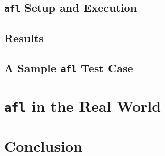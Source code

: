 \subsection{\texttt{afl} Setup and Execution}

\iffalse
nskinkel@zbox:~/src/afl/fuzz$ AFL_USE_ASAN=1 AFL_HARDEN=1 ~/src/afl/afl-2.10b/afl-gcc -g -Wall msg-parse.c
afl-cc 2.10b by <lcamtuf@google.com>
afl-as 2.10b by <lcamtuf@google.com>
[+] Instrumented 41 locations (64-bit, hardened mode, ratio 33%
\fi

\subsection{Results}


\subsection{A Sample \texttt{afl} Test Case}


\section{\texttt{afl} in the Real World}



\section{Conclusion}

